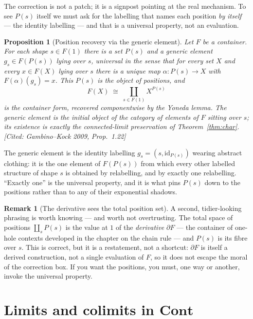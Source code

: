 \documentclass[11pt]{article}
\theoremstyle{plain}
\newtheorem{proposition}[theorem]{Proposition}
\theoremstyle{definition}
\newtheorem{remark}[theorem]{Remark}
\newcommand{\Cont}{\mathbf{Cont}}
\newcommand{\id}{\mathrm{id}}
\newcommand{\iso}{\cong}
\newcommand{\prov}[1]{\hfill\textsf{[#1]}}
\begin{document}
The correction is not a patch; it is a signpost pointing at the real mechanism. To see
$P(s)$ itself we must ask for the labelling that names each position \emph{by itself}
--- the identity labelling --- and that is a universal property, not an evaluation.

\begin{proposition}[Position recovery via the generic element]\label{prop:recover}
Let $F$ be a container. For each shape $s\in F(1)$ there is a set $P(s)$ and a
\emph{generic element} $g_s\in F(P(s))$ lying over $s$, universal in the sense that for
every set $X$ and every $x\in F(X)$ lying over $s$ there is a unique map $\alpha\colon
P(s)\to X$ with $F(\alpha)(g_s)=x$. This $P(s)$ is the object of positions, and
\[
  F(X)\;\iso\;\coprod_{s\in F(1)} X^{P(s)}
\]
is the container form, recovered componentwise by the Yoneda lemma. The generic
element is the initial object of the category of elements of $F$ sitting over $s$; its
existence is exactly the connected-limit preservation of Theorem~\ref{thm:char}.
\prov{Cited: Gambino--Kock 2009, Prop.~1.22}
\end{proposition}

The generic element is the identity labelling $g_s=(s,\id_{P(s)})$ wearing abstract
clothing: it is the one element of $F(P(s))$ from which every other labelled structure
of shape $s$ is obtained by relabelling, and by exactly one relabelling. ``Exactly
one'' is the universal property, and it is what pins $P(s)$ down to the positions
rather than to any of their exponential shadows.

\begin{remark}[The derivative sees the total position set]
A second, tidier-looking phrasing is worth knowing --- and worth not overtrusting.
The total space of positions $\coprod_{s}P(s)$ is the value at $1$ of the
\emph{derivative} $\partial F$ --- the container of one-hole contexts developed in the
chapter on the chain rule --- and $P(s)$ is its fibre over $s$. This is correct, but it
is a restatement, not a shortcut: $\partial F$ is itself a derived construction, not a
single evaluation of $F$, so it does not escape the moral of the correction box. If you
want the positions, you must, one way or another, invoke the universal property.
\end{remark}

\section{Limits and colimits in $\Cont$}
\label{sec:limits}
\end{document}
